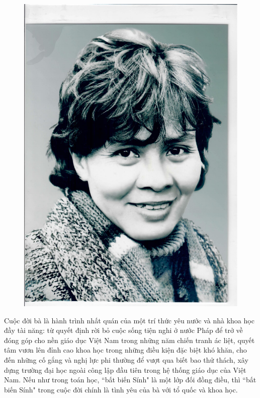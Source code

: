\begin{multicols}{2}
\begin{figure}[H]
		\includegraphics[width= 1\linewidth]{Anh12}
		\caption{\small\textit{\color{doisongtoanhoc}}}
		\vspace*{-20pt}
	\end{figure} 
	Cuộc đời bà là hành trình nhất quán của một trí thức yêu nước và nhà khoa học đầy tài năng: từ quyết định rời bỏ cuộc sống tiện nghi ở nước Pháp để trở về đóng góp cho nền giáo dục Việt Nam trong những năm chiến tranh ác liệt, quyết tâm vươn lên đỉnh cao khoa học trong những điều kiện đặc biệt khó khăn, cho đến những cố gắng và nghị lực phi thường để vượt qua biết bao thử thách, xây dựng trường đại học ngoài công lập đầu tiên trong hệ thống giáo dục của Việt Nam.
	\vskip 0.1cm
	Nếu như trong toán học, ``bất biến Sính" là một lớp đối đồng điều, thì ``bất biến Sính" trong cuộc đời chính là tình yêu của bà với tổ quốc và khoa học. 
\end{multicols}